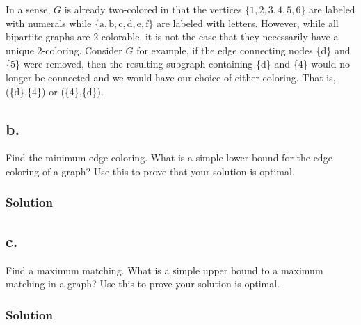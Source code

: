 \documentclass{amsart}
\begin{document}
In a sense, $G$ is already two-colored in that the vertices $\{1,2,3,4,5,6\}$
are labeled with numerals while
$\{\text{a},\text{b},\text{c},\text{d},\text{e},\text{f}\}$
are labeled with letters.
However, while all bipartite graphs are 2-colorable, it is not the case that
they necessarily have a unique 2-coloring.
Consider $G$ for example, if the edge connecting nodes \{d\} and \{5\} were
removed, then the resulting subgraph containing \{d\} and \{4\} would
no longer be connected and we would have our choice of either coloring.
That is, (\{d\},\{4\}) or (\{4\},\{d\}).


\subsection*{b.}
Find the minimum edge coloring. What is a simple lower bound for the edge coloring of a
graph? Use this to prove that your solution is optimal.
\subsubsection*{Solution}
\begin{figure}[h]
\end{figure}
\subsection*{c.}
Find a maximum matching. What is a simple upper bound to a maximum matching in a
graph? Use this to prove your solution is optimal.
\subsubsection*{Solution}
\begin{figure}[h]
\end{figure}
\end{document}
